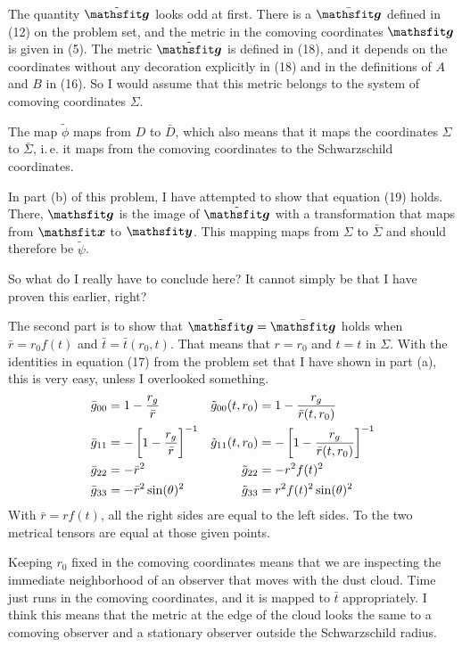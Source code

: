 The quantity $\tilde{\tens g}$ looks odd at first. There is a $\bar{\tens g}$
defined in (12) on the problem set, and the metric in the comoving coordinates
$\tens g$ is given in (5). The metric $\tilde{\tens g}$ is defined in (18), and
it depends on the coordinates without any decoration explicitly in (18) and in
the definitions of $A$ and $B$ in (16). So I would assume that this metric
belongs to the system of comoving coordinates $\Sigma$.

The map $\tilde \phi$ maps from $D$ to $\bar D$, which also means that it maps
the coordinates $\Sigma$ to $\bar \Sigma$, i.\,e. it maps from the comoving
coordinates to the Schwarzschild coordinates.

In part (b) of this problem, I have attempted to show that equation (19) holds.
There, $\tens g$ is the image of $\tilde{\tens g}$ with a transformation that
maps from $\tens x$ to $\tens y$. This mapping maps from $\Sigma$ to $\bar
\Sigma$ and should therefore be $\tilde \psi$.

So what do I really have to conclude here? It cannot simply be that I have
proven this earlier, right?

The second part is to show that $\tilde{\tens g} = \bar{\tens g}$ holds when
$\bar r = r_0 f(t)$ and $\bar t = \bar t(r_0, t)$. That means that $r = r_0$
and $t = t$ in $\Sigma$. With the identities in equation (17) from the problem
set that I have shown in part (a), this is very easy, unless I overlooked
something.
\begin{align*}
    \bar g_{00} &= 1 - \frac{r_g}{\bar r}
    &
    \tilde g_{00}(t, r_0) &= 1 - \frac{r_g}{\bar r(t, r_0)} \\
    \bar g_{11} &= - \sbr{1 - \frac{r_g}{\bar r}}^{-1}
    &
    \tilde g_{11}(t, r_0) &= - \sbr{1 - \frac{r_g}{\bar r(t, r_0)}}^{-1} \\
    \bar g_{22} &= - \bar r^2
    &
    \tilde g_{22} &= - r^2 f(t)^2 \\
    \bar g_{33} &= - \bar r^2 \sin(\theta)^2
    &
    \tilde g_{33} &= r^2 f(t)^2 \sin(\theta)^2
\end{align*}
With $\bar r = r f(t)$, all the right sides are equal to the left sides. To the
two metrical tensors are equal at those given points.

Keeping $r_0$ fixed in the comoving coordinates means that we are inspecting
the immediate neighborhood of an observer that moves with the dust cloud. Time
just runs in the comoving coordinates, and it is mapped to $\bar t$
appropriately. I think this means that the metric at the edge of the cloud
looks the same to a comoving observer and a stationary observer outside the
Schwarzschild radius.

\IfFileExists{\bibliographyfile}{
    \printbibliography
}{}



